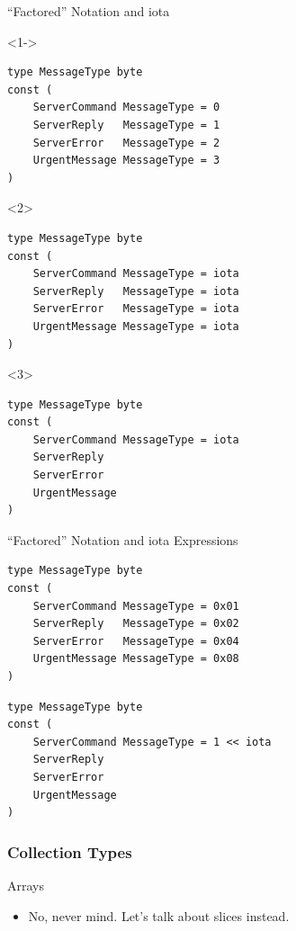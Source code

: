 \documentclass[pdf]{beamer}
\begin{document}
\begin{frame}[fragile]{``Factored'' Notation and iota}
\begin{onlyenv}<1->
\begin{lstlisting}
type MessageType byte
const (
    ServerCommand MessageType = 0
    ServerReply   MessageType = 1
    ServerError   MessageType = 2
    UrgentMessage MessageType = 3
)
\end{lstlisting}
\end{onlyenv}
\vfill\strut
\begin{onlyenv}<2>
\begin{lstlisting}
type MessageType byte
const (
    ServerCommand MessageType = iota
    ServerReply   MessageType = iota
    ServerError   MessageType = iota
    UrgentMessage MessageType = iota
)
\end{lstlisting}
\end{onlyenv}
\begin{onlyenv}<3>
\begin{lstlisting}
type MessageType byte
const (
    ServerCommand MessageType = iota
    ServerReply   
    ServerError   
    UrgentMessage 
)
\end{lstlisting}
\end{onlyenv}
\end{frame}
\begin{frame}[fragile]{``Factored'' Notation and iota Expressions}
\begin{lstlisting}
type MessageType byte
const (
    ServerCommand MessageType = 0x01
    ServerReply   MessageType = 0x02
    ServerError   MessageType = 0x04
    UrgentMessage MessageType = 0x08
)
\end{lstlisting}
\vfill\strut
\begin{lstlisting}
type MessageType byte
const (
    ServerCommand MessageType = 1 << iota
    ServerReply   
    ServerError   
    UrgentMessage 
)
\end{lstlisting}
\end{frame}

\subsubsection{Collection Types}
\begin{frame}[fragile]{Arrays}
	\begin{itemize}
		\item No, never mind. Let's talk about slices instead.
	\end{itemize}
\end{frame}
\end{document}
